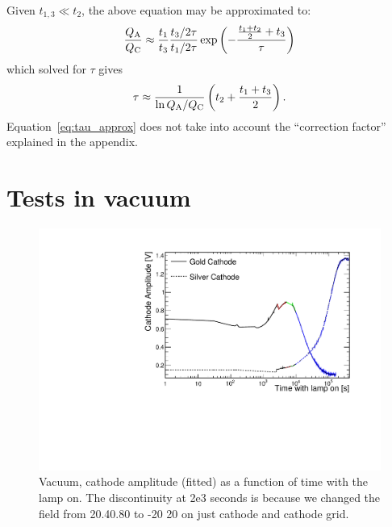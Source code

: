 \documentclass[a4paper,11pt]{article}
\begin{document}
Given $t_{1,3} \ll t_2$, the above equation may be approximated to:
\begin{equation}
    \frac{Q_{\rm A}}{Q_{\rm C}} \approx \frac{t_1}{t_3} 
    \frac{t_3/2\tau}{t_1/2\tau}
    \exp{\left(-\frac{\frac{t_1+t_2}{2}+t_3}{\tau}\right)}
\end{equation}
 which solved for $\tau$ gives
\begin{equation}
    \tau \approx \frac{1}{\ln{Q_{\rm A}/Q_{\rm C}}}\left ( t_2 + \frac{t_1+t_3}{2}\right).
    \label{eq:tau_approx}
\end{equation}
Equation~\ref{eq:tau_approx} does not take into account the ``correction factor'' explained in the appendix. 

\section{Tests in vacuum}
\begin{figure}[t]
    \centering
    \includegraphics[width=.8\linewidth]{figures/SilverAndGoldVStime.pdf}
    \caption{Vacuum, cathode amplitude (fitted) as a function of time with the lamp on. The discontinuity at 2e3 seconds is because we changed the field from 20.40.80 to -20 20 on just cathode and cathode grid.}
    \label{fig:silver_gold_over_time}
\end{figure}
\end{document}
